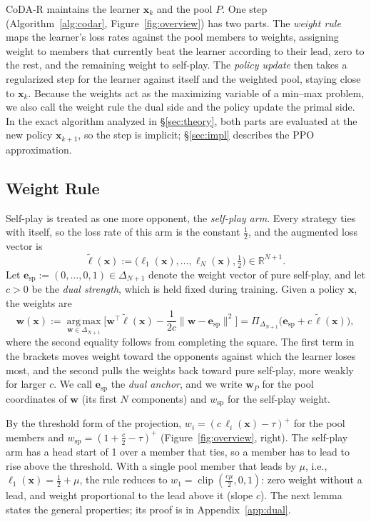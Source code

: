 \documentclass{article}
\theoremstyle{plain}
\theoremstyle{remark}
\newcommand{\Proj}{\Pi}
\newcommand{\simplex}{\Delta}
\newcommand{\bx}{{\bm{x}}}
\newcommand{\bw}{{\bm{w}}}
\newcommand{\be}{{\bm{e}}}
\newcommand{\bell}{{\bm{\ell}}}
\newcommand{\aug}{\tilde{\bell}}
\newcommand{\esp}{\be_{\mathrm{sp}}}
\newcommand{\wsp}{w_{\mathrm{sp}}}
\newcommand{\codar}{CoDA-R}
\begin{document}
\codar{} maintains the learner $\bx_k$ and the pool $P$. One step (Algorithm~\ref{alg:codar}, Figure~\ref{fig:overview}) has two parts. The \emph{weight rule} maps the learner's loss rates against the pool members to weights, assigning weight to members that currently beat the learner according to their lead, zero to the rest, and the remaining weight to self-play. The \emph{policy update} then takes a regularized step for the learner against itself and the weighted pool, staying close to $\bx_k$. Because the weights act as the maximizing variable of a min--max problem, we also call the weight rule the dual side and the policy update the primal side. In the exact algorithm analyzed in \S\ref{sec:theory}, both parts are evaluated at the new policy $\bx_{k+1}$, so the step is implicit; \S\ref{sec:impl} describes the PPO approximation.

\subsection{Weight Rule}
\label{sec:dual}

Self-play is treated as one more opponent, the \emph{self-play arm}. Every strategy ties with itself, so the loss rate of this arm is the constant $\tfrac12$, and the augmented loss vector is
\[
\aug(\bx):=\big(\ell_1(\bx),\dots,\ell_N(\bx),\tfrac12\big)\in\mathbb R^{N+1}.
\]
Let $\esp:=(0,\dots,0,1)\in\simplex_{N+1}$ denote the weight vector of pure self-play, and let $c>0$ be the \emph{dual strength}, which is held fixed during training. Given a policy $\bx$, the weights are
\begin{equation}
\bw(\bx):=\operatorname*{arg\,max}_{\bw\in\simplex_{N+1}}\Big[\bw^\top\aug(\bx)-\frac1{2c}\|\bw-\esp\|^2\Big]=\Proj_{\simplex_{N+1}}\big(\esp+c\,\aug(\bx)\big),
\label{eq:dual}
\end{equation}
where the second equality follows from completing the square. The first term in the brackets moves weight toward the opponents against which the learner loses most, and the second pulls the weights back toward pure self-play, more weakly for larger $c$. We call $\esp$ the \emph{dual anchor}, and we write $\bw_P$ for the pool coordinates of $\bw$ (its first $N$ components) and $\wsp$ for the self-play weight.

By the threshold form of the projection, $w_i=(c\,\ell_i(\bx)-\tau)^+$ for the pool members and $\wsp=(1+\tfrac c2-\tau)^+$ (Figure~\ref{fig:overview}, right). The self-play arm has a head start of 1 over a member that ties, so a member has to lead to rise above the threshold. With a single pool member that leads by $\mu$, i.e., $\ell_1(\bx)=\tfrac12+\mu$, the rule reduces to $w_1=\operatorname{clip}(\tfrac{c\mu}2,0,1)$: zero weight without a lead, and weight proportional to the lead above it (slope $c$). The next lemma states the general properties; its proof is in Appendix~\ref{app:dual}.
\end{document}
